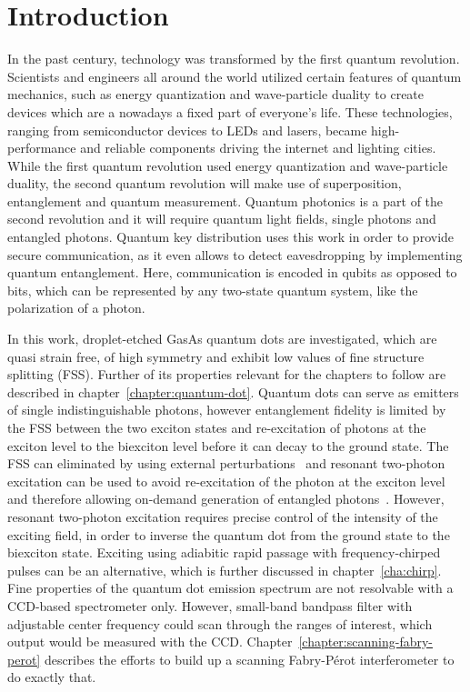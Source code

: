 \chapter{Introduction}

In the past century, technology was transformed by the first quantum revolution. Scientists and engineers all around the world utilized certain features of quantum mechanics, such as energy quantization and wave-particle duality to create devices which are a nowadays a fixed part of everyone's life.
These technologies, ranging from semiconductor devices to LEDs and lasers, became high-performance  and reliable components driving the internet and lighting cities.
While the first quantum revolution used energy quantization and wave-particle duality, the second quantum revolution will make use of superposition, entanglement and quantum measurement.
Quantum photonics is a part of the second revolution and it will require quantum light fields, single photons and entangled photons.
Quantum key distribution uses this work in order to provide secure communication, as it even allows to detect eavesdropping by implementing quantum entanglement.
Here, communication is encoded in qubits as opposed to bits, which can be represented by any two-state quantum system, like the polarization of a photon.

In this work, droplet-etched GasAs quantum dots are investigated, which are quasi strain free, of high symmetry and exhibit low values of fine structure splitting (\acs{FSS}).
Further of its properties relevant for the chapters to follow are described in chapter~\ref{chapter:quantum-dot}.
Quantum dots can serve as emitters of single indistinguishable photons, however entanglement fidelity is limited by the \acs{FSS} between the two exciton states \cite{bayer_fine_2002} and re-excitation of photons at the exciton level to the biexciton level before it can decay to the ground state.
The FSS can eliminated by using external perturbations~\cite{plumhof_experimental_2012} and resonant two-photon excitation can be used to avoid re-excitation of the photon at the exciton level and therefore allowing on-demand generation of entangled photons~\cite{jayakumar_deterministic_2013}.
However, resonant two-photon excitation requires precise control of the intensity of the exciting field, in order to inverse the quantum dot from the ground state to the biexciton state.
Exciting using adiabitic rapid passage with frequency-chirped pulses can be an alternative, which is further discussed in chapter~\ref{cha:chirp}.
Fine properties of the quantum dot emission spectrum are not resolvable with a CCD-based spectrometer only.
However, small-band bandpass filter with adjustable center frequency could scan through the ranges of interest, which output would be measured with the CCD.
Chapter~\ref{chapter:scanning-fabry-perot} describes the efforts to build up a scanning Fabry-Pérot interferometer to do exactly that.


